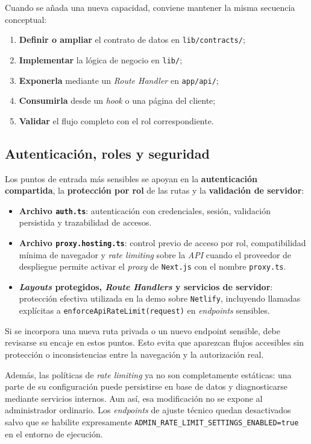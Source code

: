 Cuando se añada una nueva capacidad, conviene mantener la misma secuencia conceptual:

\begin{enumerate}
    \item \textbf{Definir o ampliar} el contrato de datos en \texttt{lib/contracts/};
    \item \textbf{Implementar} la lógica de negocio en \texttt{lib/};
    \item \textbf{Exponerla} mediante un \textit{Route Handler} en \texttt{app/api/};
    \item \textbf{Consumirla} desde un \textit{hook} o una página del cliente;
    \item \textbf{Validar} el flujo completo con el rol correspondiente.
\end{enumerate}

\subsection{Autenticación, roles y seguridad}

Los puntos de entrada más sensibles se apoyan en la \textbf{autenticación compartida}, la \textbf{protección por rol} de las rutas y la \textbf{validación de servidor}:

\begin{itemize}
    \item \textbf{Archivo \texttt{auth.ts}}: autenticación con credenciales, sesión, validación persistida y trazabilidad de accesos.
    \item \textbf{Archivo \texttt{proxy.hosting.ts}}: control previo de acceso por rol, compatibilidad mínima de navegador y \textit{rate limiting} sobre la \textit{API} cuando el proveedor de despliegue permite activar el \textit{proxy} de \texttt{Next.js} con el nombre \texttt{proxy.ts}.
    \item \textbf{\textit{Layouts} protegidos, \textit{Route Handlers} y servicios de servidor}: protección efectiva utilizada en la demo sobre \texttt{Netlify}, incluyendo llamadas explícitas a \texttt{enforceApiRateLimit(request)} en \textit{endpoints} sensibles.
\end{itemize}

Si se incorpora una nueva ruta privada o un nuevo endpoint sensible, debe revisarse su encaje en estos puntos. Esto evita que aparezcan flujos accesibles sin protección o inconsistencias entre la navegación y la autorización real.

Además, las políticas de \textit{rate limiting} ya no son completamente estáticas: una parte de su configuración puede persistirse en base de datos y diagnosticarse mediante servicios internos. Aun así, esa modificación no se expone al administrador ordinario. Los \textit{endpoints} de ajuste técnico quedan desactivados salvo que se habilite expresamente \texttt{ADMIN\_RATE\_LIMIT\_SETTINGS\_ENABLED=true} en el entorno de ejecución.

